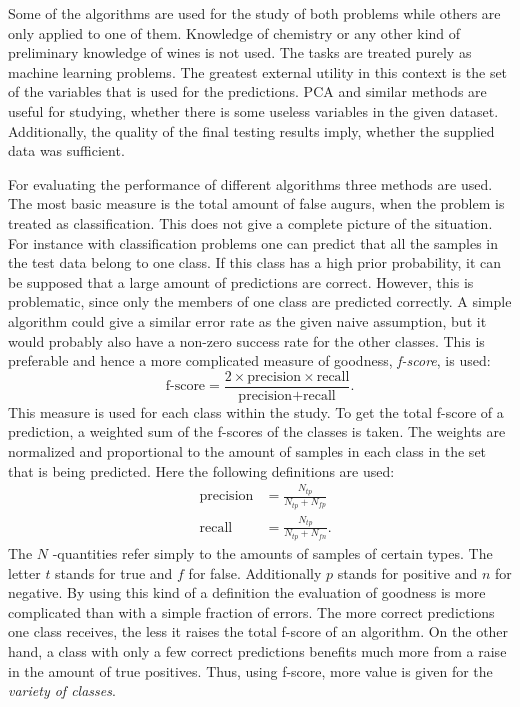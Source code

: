 \documentclass[twoside]{article}
\begin{document}
\begin{multicols}{2}
Some of the algorithms are used for the study of both problems while others are only applied to one of them.
Knowledge of chemistry or any other kind of preliminary knowledge of wines is not used. The tasks are treated purely as machine learning
problems. The greatest external utility in this context is the set of the variables that is used for the predictions. 
PCA and similar methods are useful
for studying, whether there is some useless variables in the given dataset. Additionally, the quality of the final testing results imply, whether the supplied
data was sufficient.

For evaluating the performance of different algorithms three methods are used. The 
most basic measure is the total amount of false augurs, when the problem is treated as classification.
This does not give a complete picture of the situation. For instance
with classification problems one can predict that all the samples in the test data belong to one class. If
this class has a high prior probability, it can be supposed that a large amount of predictions are correct.
However, this is problematic, since only the members of one class are predicted correctly. A simple algorithm
could give a similar error rate as the given naive assumption, but it would probably also have a non-zero success
rate for the other classes. This is preferable and hence a more complicated measure of goodness, \emph{f-score}, is used:
\begin{equation}
 \text{f-score} = \frac{ 2 \times \text{precision} \times \text{recall} }{\text{precision} + \text{recall}}.
\end{equation}
This measure is used for each class within the study. To get the total f-score of a prediction, a weighted sum of
the f-scores of the classes is taken. The weights are normalized and proportional to the amount of samples in
each class in the set that is being predicted. Here the following definitions are used:
\begin{eqnarray}
 &\text{precision} & = \frac{N_{tp}}{N_{tp}+N_{fp}} \\
 &\text{recall} & = \frac{N_{tp}}{N_{tp}+N_{fn}}.
\end{eqnarray}
The $N$ -quantities refer simply to the amounts of samples of certain types. The letter $t$ stands for true and $f$ for false.
Additionally $p$ stands for positive and $n$ for negative. By using this kind of a definition the evaluation of goodness
is more complicated than with a simple fraction of errors. The more correct predictions one class receives, the less it raises
the total f-score of an algorithm. On the other hand, a class with only a few correct predictions benefits much more from
a raise in the amount of true positives. Thus, using f-score, more value is given for the \emph{variety of classes}.


\end{multicols}
\end{document}
